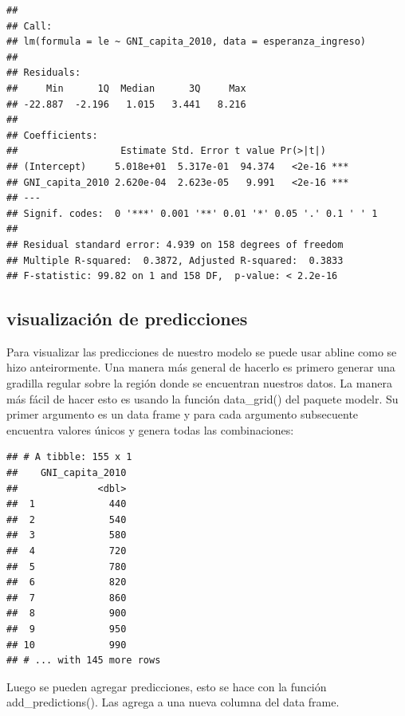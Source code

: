 \documentclass[]{book}
\newenvironment{Shaded}{\begin{snugshade}}{\end{snugshade}}
\newcommand{\KeywordTok}[1]{\textcolor[rgb]{0.13,0.29,0.53}{\textbf{#1}}}
\newcommand{\DecValTok}[1]{\textcolor[rgb]{0.00,0.00,0.81}{#1}}
\newcommand{\StringTok}[1]{\textcolor[rgb]{0.31,0.60,0.02}{#1}}
\newcommand{\OperatorTok}[1]{\textcolor[rgb]{0.81,0.36,0.00}{\textbf{#1}}}
\newcommand{\NormalTok}[1]{#1}
\theoremstyle{definition}
\theoremstyle{definition}
\theoremstyle{definition}
\theoremstyle{remark}
\begin{document}
\begin{verbatim}
## 
## Call:
## lm(formula = le ~ GNI_capita_2010, data = esperanza_ingreso)
## 
## Residuals:
##     Min      1Q  Median      3Q     Max 
## -22.887  -2.196   1.015   3.441   8.216 
## 
## Coefficients:
##                  Estimate Std. Error t value Pr(>|t|)    
## (Intercept)     5.018e+01  5.317e-01  94.374   <2e-16 ***
## GNI_capita_2010 2.620e-04  2.623e-05   9.991   <2e-16 ***
## ---
## Signif. codes:  0 '***' 0.001 '**' 0.01 '*' 0.05 '.' 0.1 ' ' 1
## 
## Residual standard error: 4.939 on 158 degrees of freedom
## Multiple R-squared:  0.3872, Adjusted R-squared:  0.3833 
## F-statistic: 99.82 on 1 and 158 DF,  p-value: < 2.2e-16
\end{verbatim}

\subsection{visualización de
predicciones}\label{visualizacion-de-predicciones}

Para visualizar las predicciones de nuestro modelo se puede usar abline
como se hizo anteirormente. Una manera más general de hacerlo es primero
generar una gradilla regular sobre la región donde se encuentran
nuestros datos. La manera más fácil de hacer esto es usando la función
data\_grid() del paquete modelr. Su primer argumento es un data frame y
para cada argumento subsecuente encuentra valores únicos y genera todas
las combinaciones:

\begin{Shaded}
\end{Shaded}

\begin{verbatim}
## # A tibble: 155 x 1
##    GNI_capita_2010
##              <dbl>
##  1             440
##  2             540
##  3             580
##  4             720
##  5             780
##  6             820
##  7             860
##  8             900
##  9             950
## 10             990
## # ... with 145 more rows
\end{verbatim}

Luego se pueden agregar predicciones, esto se hace con la función
add\_predictions(). Las agrega a una nueva columna del data frame.
\end{document}
